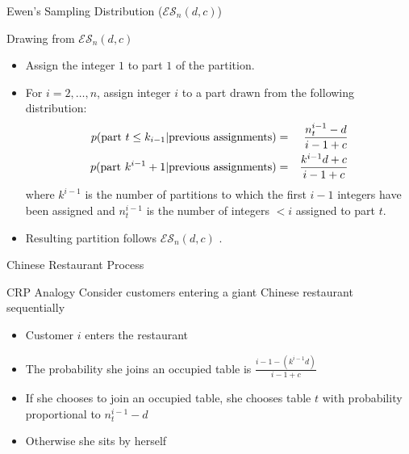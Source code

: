 \documentclass{beamer}
\newcommand{\ES}{\mathcal{E}\mathcal{S}}
\begin{document}
\begin{frame}[t]{Ewen's Sampling Distribution ($\ES_n(d,c)$)}

	\begin{block}{Drawing from $\ES_n(d,c)$}
		\begin{itemize}
			\item Assign the integer $1$ to part $1$ of the partition.
			\item {For $i = 2, \ldots, n$, assign integer $i$ to a part drawn from the following distribution: \\
				\vspace{-.65cm}
				\begin{eqnarray*}
					p({\rm part~}t \leq k_{i-1}  | {\rm previous~assignments}) &=& \frac{n^{i-1}_t - d}{i-1 + c}\\
					p({\rm  part~} k^{i-1} + 1 | {\rm previous~ assignments}) &=& \frac{k^{i-1}d + c}{i-1 + c}\\
				\end{eqnarray*}
				\noindent where $k^{i-1}$ is the number of partitions to which the first $i-1$ integers have been assigned and $n^{i-1}_t$ is the number of integers $< i$ assigned to part $t$.
			}
			\item{Resulting partition follows $\ES_n(d,c)$  \cite{Pitman1995}}.
		\end{itemize}
	\end{block}
	
\end{frame}

\begin{frame}[t]{Chinese Restaurant Process}
	
	\begin{block}{CRP Analogy}
			Consider customers entering a giant Chinese restaurant sequentially
		\begin{itemize}
			\item Customer $i$ enters the restaurant
			\item The probability she joins an occupied table is $\frac{i-1 - (k^{i-1}d)}{i-1+c}$
			\item If she chooses to join an occupied table, she chooses table $t$ with probability proportional to $n_t^{i-1} - d$
			\item Otherwise she sits by herself
		\end{itemize}
	\end{block}
	
\end{frame}
\end{document}
